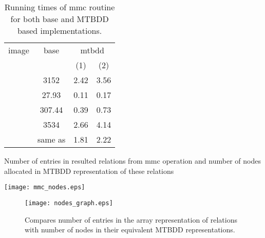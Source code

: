 \documentclass[4pt]{article}
\begin{document}
\begin{table}
\begin{center}
\begin{footnotesize}

\caption{Running times of mmc routine for both base and MTBDD based implementations.}
\label{mmc_times}


\begin{tabular} {|c|c| cc |}
\hline
image & base & \multicolumn{2}{c}{mtbdd} \vline \\

      &      & (1)     &     (2) \\ \hline 
 & 3152 & 2.42 &  3.56 \\ \hline
 & 27.93 & 0.11 & 0.17 \\ \hline
 & 307.44 & 0.39 & 0.73 \\ \hline
 & 3534 & 2.66 & 4.14 \\ \hline
 & same as  & 1.81 & 2.22\\ \hline
      
\end{tabular}
\end{footnotesize}
\end{center}

\end{table}

\begin{table}
\begin{footnotesize}

\caption{Number of entries in resulted relations from mmc operation and number of nodes allocated in MTBDD representation of these relations}
\label{mmc_nodes}

\begin{center}
\texttt{[image: mmc\_nodes.eps]}
\end{center}

\end{footnotesize}
\end{table}
\begin{figure*}
\centering \texttt{[image: nodes\_graph.eps]}


\caption{Compares number of entries in the array representation of relations with number of nodes in their equivalent MTBDD representations.}
\label{nodes_graph}

\end{figure*}
\end{document}

